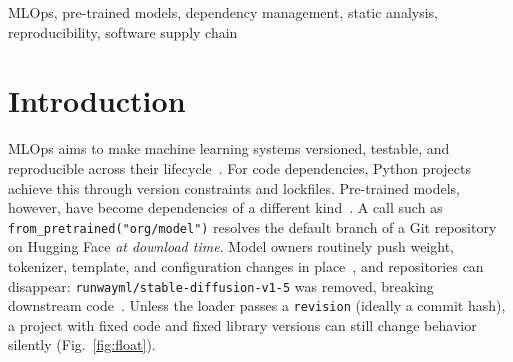\documentclass[conference]{IEEEtran}
\begin{document}
\begin{IEEEkeywords}
MLOps, pre-trained models, dependency management, static analysis, reproducibility, software supply chain
\end{IEEEkeywords}

\section{Introduction}
MLOps aims to make machine learning systems versioned, testable, and reproducible across their lifecycle~\cite{kreuzberger2023, sculley2015}. For code dependencies, Python projects achieve this through version constraints and lockfiles. Pre-trained models, however, have become dependencies of a different kind~\cite{yasmin2025}. A call such as \texttt{from\_pretrained("org/model")} resolves the default branch of a Git repository on Hugging Face \emph{at download time}. Model owners routinely push weight, tokenizer, template, and configuration changes in place~\cite{ajibode2025, castano2024}, and repositories can disappear: \texttt{runwayml/stable-diffusion-v1-5} was removed, breaking downstream code~\cite{habana1305}. Unless the loader passes a \texttt{revision} (ideally a commit hash), a project with fixed code and fixed library versions can still change behavior silently (Fig.~\ref{fig:float}).
\end{document}

